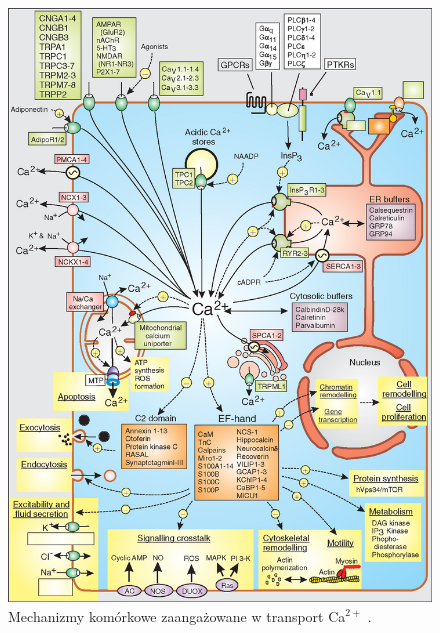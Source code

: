 \begin{figure}[tb]
\centering
\includegraphics[width=1\textwidth]{rysunki/rozdzial_1/toolkit.jpg}
\caption [Mechanizmy komórkowe zaangażowane w transport Ca$^{2+}$]{Mechanizmy komórkowe zaangażowane w transport Ca$^{2+}$ \cite{Berridge2012b,Clapham2007}.}
\label{fig:toolkit}
\end{figure}




\FloatBarrier
